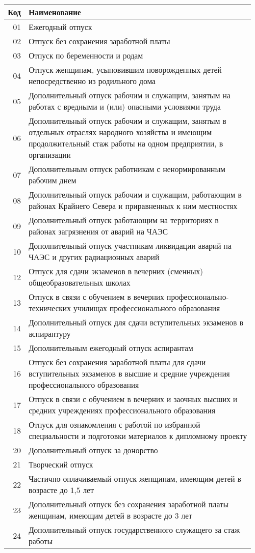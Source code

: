 \documentclass[10pt, a4paper, titlepage]{article}
\begin{document}
\begin{center}
    \begin{longtable}{rp{}}
        \hline
        \textbf{Код} & \textbf{Наименование} \\ \hline
        01 & Ежегодный отпуск \\
        02 & Отпуск без сохранения заработной платы \\
        03 & Отпуск по беременности и родам \\
        04 & Отпуск женщинам, усыновившим новорожденных детей непосредственно из родильного дома \\
        05 & Дополнительный отпуск рабочим и служащим, занятым на работах с вредными и (или) опасными условиями труда \\
        06 & Дополнительный отпуск рабочим и служащим, занятым в отдельных отраслях народного хозяйства и имеющим продолжительный стаж работы на одном предприятии, в организации \\
        07 & Дополнительным отпуск работникам с ненормированным рабочим днем \\
        08 & Дополнительный отпуск рабочим и служащим, работающим в районах Крайнего Севера и приравненных к ним местностях \\
        09 & Дополнительный отпуск работающим на территориях в районах загрязнения от аварий на ЧАЭС \\
        10 & Дополнительный отпуск участникам ликвидации аварий на ЧАЭС и других радиационных аварий \\
        12 & Отпуск для сдачи экзаменов в вечерних (сменных) общеобразовательных школах \\
        13 & Отпуск в связи с обучением в вечерних профессионально-технических училищах профессионального образования \\
        14 & Дополнительный отпуск для сдачи вступительных экзаменов в аспирантуру \\
        15 & Дополнительным ежегодный отпуск аспирантам \\
        16 & Отпуск без сохранения заработной платы для сдачи вступительных экзаменов в высшие и средние учреждения профессионального образования \\
        17 & Отпуск в связи с обучением в вечерних и заочных высших и средних учреждениях профессионального образования \\
        18 & Отпуск для ознакомления с работой по избранной специальности и подготовки материалов к дипломному проекту \\
        20 & Дополнительный отпуск за донорство \\
        21 & Творческий отпуск \\
        22 & Частично оплачиваемый отпуск женщинам, имеющим детей в возрасте до 1,5 лет \\
        23 & Дополнительный отпуск без сохранения заработной платы женщинам, имеющим детей в возрасте до 3 лет \\
        24 & Дополнительный отпуск государственного служащего за стаж работы \\
    \end{longtable}
\end{center}
\end{document}
